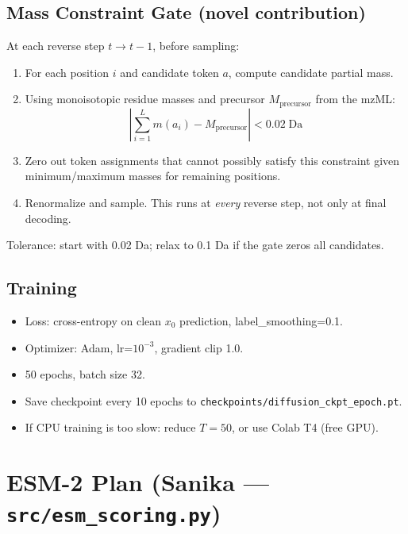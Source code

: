 \documentclass[11pt,letterpaper]{article}
\begin{document}
\subsection*{Mass Constraint Gate (novel contribution)}
At each reverse step $t \rightarrow t{-}1$, before sampling:
\begin{enumerate}
  \item For each position $i$ and candidate token $a$, compute candidate partial mass.
  \item Using monoisotopic residue masses and precursor $M_\text{precursor}$ from the mzML:
    \[ \left|\sum_{i=1}^{L} m(a_i) - M_\text{precursor}\right| < 0.02\;\text{Da} \]
  \item Zero out token assignments that cannot possibly satisfy this constraint
    given minimum/maximum masses for remaining positions.
  \item Renormalize and sample. This runs at \textit{every} reverse step, not only at final decoding.
\end{enumerate}
Tolerance: start with 0.02 Da; relax to 0.1 Da if the gate zeros all candidates.

\subsection*{Training}
\begin{itemize}
  \item Loss: cross-entropy on clean $x_0$ prediction, label\_smoothing=0.1.
  \item Optimizer: Adam, lr=$10^{-3}$, gradient clip 1.0.
  \item 50 epochs, batch size 32.
  \item Save checkpoint every 10 epochs to \texttt{checkpoints/diffusion\_ckpt\_{epoch}.pt}.
  \item If CPU training is too slow: reduce $T = 50$, or use Colab T4 (free GPU).
\end{itemize}

\section{ESM-2 Plan (Sanika --- \texttt{src/esm\_scoring.py})}
\end{document}
